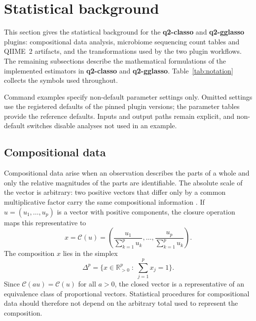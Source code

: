 \documentclass[11pt,a4paper]{article}
\newcommand{\pkg}[1]{\textbf{#1}}
\newcommand{\R}{\mathbb{R}}
\newcommand{\simplex}{\Delta}
\begin{document}
\section{Statistical background}
\label{sec:models}

This section gives the statistical background for the \pkg{q2-classo} and
\pkg{q2-gglasso} plugins: compositional data analysis, microbiome sequencing
count tables and QIIME~2 artifacts, and the transformations used by the two
plugin workflows. The remaining subsections describe the mathematical
formulations of the implemented estimators in \pkg{q2-classo} and \pkg{q2-gglasso}. 
Table~\ref{tab:notation} collects the symbols used throughout.

Command examples specify non-default parameter settings only. Omitted settings
use the registered defaults of the pinned plugin versions; the parameter
tables provide the reference defaults. Inputs and output paths remain
explicit, and non-default switches disable analyses not used in an example.

\vspace{5pt}

\subsection{Compositional data}
\label{sec:compositional-data}

Compositional data arise when an observation describes the parts of a whole and
only the relative magnitudes of the parts are identifiable. The absolute scale of
the vector is arbitrary: two positive vectors that differ only by a common
multiplicative factor carry the same compositional information
\citep{aitchison1982statistical,gloor2017microbiome}. If
$u=(u_1,\ldots,u_p)$ is a vector with positive components, the closure operation
maps this representative to
\begin{equation}
\label{eq:closure}
x = \mathcal{C}(u)
= \left(\frac{u_1}{\sum_{k=1}^{p}u_k},\ldots,
\frac{u_p}{\sum_{k=1}^{p}u_k}\right).
\end{equation}
The composition $x$ lies in the simplex
\begin{equation}
\label{eq:simplex}
\simplex^{p} = \Big\{ x \in \R^{p}_{>0} \; : \; \textstyle\sum_{j=1}^{p} x_j = 1 \Big\}.
\end{equation}
Since $\mathcal{C}(a u)=\mathcal{C}(u)$ for all $a>0$, the closed vector is a
representative of an equivalence class of proportional vectors. Statistical
procedures for compositional data should therefore not depend on the arbitrary
total used to represent the composition.
\end{document}
